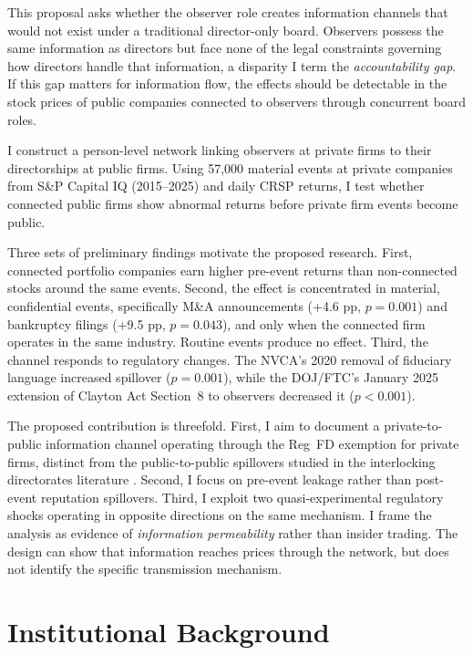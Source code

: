 \documentclass[12pt]{article}
\begin{document}
This proposal asks whether the observer role creates information channels that would not exist under a traditional director-only board. Observers possess the same information as directors but face none of the legal constraints governing how directors handle that information, a disparity I term the \textit{accountability gap}. If this gap matters for information flow, the effects should be detectable in the stock prices of public companies connected to observers through concurrent board roles.

I construct a person-level network linking observers at private firms to their directorships at public firms. Using 57,000 material events at private companies from S\&P Capital IQ (2015--2025) and daily CRSP returns, I test whether connected public firms show abnormal returns before private firm events become public.

Three sets of preliminary findings motivate the proposed research. First, connected portfolio companies earn higher pre-event returns than non-connected stocks around the same events. Second, the effect is concentrated in material, confidential events, specifically M\&A announcements (+4.6 pp, $p=0.001$) and bankruptcy filings (+9.5 pp, $p=0.043$), and only when the connected firm operates in the same industry. Routine events produce no effect. Third, the channel responds to regulatory changes. The NVCA's 2020 removal of fiduciary language increased spillover ($p=0.001$), while the DOJ/FTC's January 2025 extension of Clayton Act Section~8 to observers decreased it ($p<0.001$).

The proposed contribution is threefold. First, I aim to document a private-to-public information channel operating through the Reg~FD exemption for private firms, distinct from the public-to-public spillovers studied in the interlocking directorates literature \cite{kang2008director,shi2025shared,fracassi2017corporate}. Second, I focus on pre-event leakage rather than post-event reputation spillovers. Third, I exploit two quasi-experimental regulatory shocks operating in opposite directions on the same mechanism. I frame the analysis as evidence of \textit{information permeability} rather than insider trading. The design can show that information reaches prices through the network, but does not identify the specific transmission mechanism.

\section{Institutional Background}
\label{sec:institutional}
\end{document}
